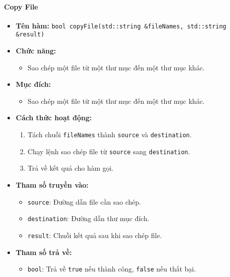 \paragraph{Copy File}
\begin{itemize}
    \item \textbf{Tên hàm:} \texttt{bool copyFile(std::string \&fileNames, std::string \&result)}
    \item \textbf{Chức năng:}
    \begin{itemize}
        \item Sao chép một file từ một thư mục đến một thư mục khác.
    \end{itemize}
    \item \textbf{Mục đích:}
    \begin{itemize}
        \item Sao chép một file từ một thư mục đến một thư mục khác.
    \end{itemize}
    \item \textbf{Cách thức hoạt động:}
    \begin{enumerate}
        \item Tách chuỗi \texttt{fileNames} thành \texttt{source} và \texttt{destination}.
        \item Chạy lệnh sao chép file từ \texttt{source} sang \texttt{destination}.
        \item Trả về kết quả cho hàm gọi.
    \end{enumerate}
    \item \textbf{Tham số truyền vào:}
    \begin{itemize}
        \item \texttt{source}: Đường dẫn file cần sao chép.
        \item \texttt{destination}: Đường dẫn thư mục đích.
        \item \texttt{result}: Chuỗi kết quả sau khi sao chép file.
    \end{itemize}
    \item \textbf{Tham số trả về:}
    \begin{itemize}
        \item \texttt{bool}: Trả về \texttt{true} nếu thành công, \texttt{false} nếu thất bại.
    \end{itemize}
\end{itemize}

